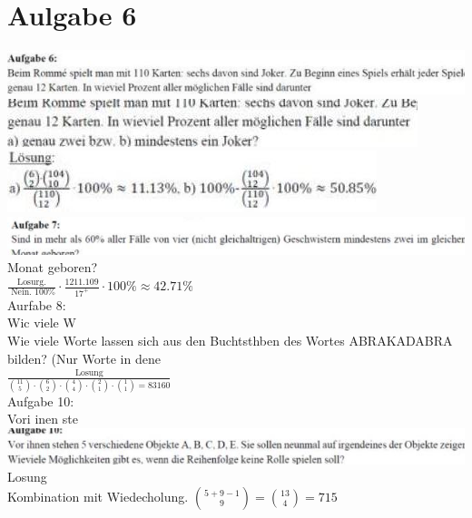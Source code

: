 \documentclass[10pt]{article}
\begin{document}
\section*{Aulgabe 6}
\includegraphics[max width=\textwidth, center]{2024_12_29_0906b02acf849bda8665g-3(16)}\\
\includegraphics[max width=\textwidth, center]{2024_12_29_0906b02acf849bda8665g-3(14)}\\
\includegraphics[max width=\textwidth, center]{2024_12_29_0906b02acf849bda8665g-3(18)}\\
\includegraphics[max width=\textwidth]{2024_12_29_0906b02acf849bda8665g-3(19)} Monat geboren?\\
$\frac{\text { Losurg. }}{\text { Nein. } 100 \%} \cdot \frac{1211.109}{17^{+}} \cdot 100 \% \approx 42.71 \%$\\
Aurfabe 8:\\
Wic viele W\\
Wie viele Worte lassen sich aus den Buchtsthben des Wortes ABRAKADABRA bilden? (Nur Worte in dene\\
$\frac{\text { Losung }}{\binom{11}{5} \cdot\binom{6}{2} \cdot\binom{4}{4} \cdot\binom{2}{1} \cdot\binom{1}{1}=83160}$\\
Aufgabe 10:\\
Vori inen ste\\
\includegraphics[max width=\textwidth, center]{2024_12_29_0906b02acf849bda8665g-3(6)}\\
Losung\\
Kombination mit Wiedecholung. $\binom{5+9-1}{9}=\binom{13}{4}=715$\\
\end{document}
